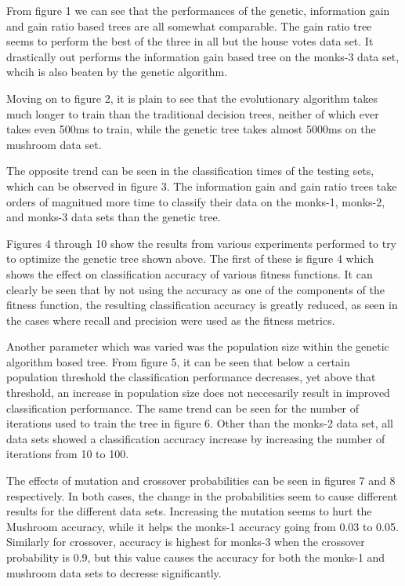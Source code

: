 \documentclass[12pt, letterpaper]{article}
\begin{document}
From figure 1 we can see that the performances of the genetic, information
gain and gain ratio based trees are all somewhat comparable.  The gain ratio
tree seems to perform the best of the three in all but the house votes data set.
It drastically out performs the information gain based tree on the monks-3 data
set, whcih is also beaten by the genetic algorithm.

Moving on to figure 2, it is plain to see that the evolutionary algorithm
takes much longer to train than the traditional decision trees, neither of which
ever takes even 500ms to train, while the genetic tree takes almost 5000ms on 
the mushroom data set.

The opposite trend can be seen in the classification times of the testing sets,
which can be observed in figure 3.
The information gain and gain ratio trees take orders of magnitued more time
to classify their data on the monks-1, monks-2, and monks-3 data sets than the
genetic tree.

Figures 4 through 10 show the results from various experiments performed to 
try to optimize the genetic tree shown above. The first of these is figure 4
which shows the effect on classification accuracy of various fitness functions.
It can clearly be seen that by not using the accuracy as one of the components
of the fitness function, the resulting classification accuracy is greatly
reduced, as seen in the cases where recall and precision were used as the 
fitness metrics.

Another parameter which was varied was the population size within the genetic
algorithm based tree.  From figure 5, it can be seen that below a certain 
population threshold the classification performance decreases, yet above that
threshold, an increase in population size does not neccesarily result in 
improved classification performance. The same trend can be seen for the number
of iterations used to train the tree in figure 6. Other than the monks-2 data 
set, all data sets showed a classification accuracy increase by increasing the
number of iterations from 10 to 100.

The effects of mutation and crossover probabilities can be seen in figures 7 
and 8 respectively.  In both cases, the change in the probabilities seem to 
cause different results for the different data sets.  Increasing the mutation
seems to hurt the Mushroom accuracy, while it helps the monks-1 accuracy going
from 0.03 to 0.05.  Similarly for crossover, accuracy is highest for monks-3 
when the crossover probability is 0.9, but this value causes the accuracy for
both the monks-1 and mushroom data sets to decresse significantly.  
\end{document}

